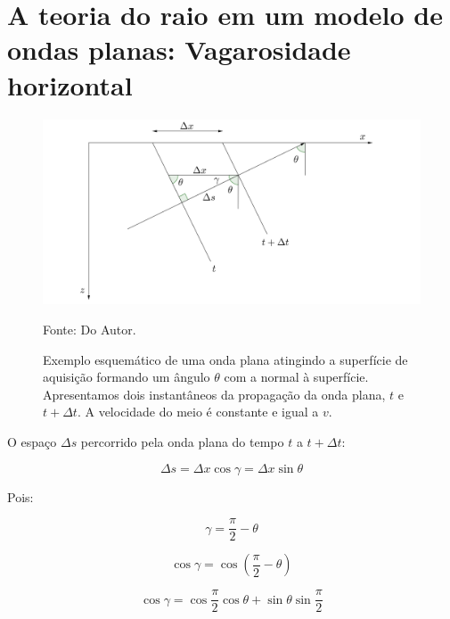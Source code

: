 \documentclass[a4paper, 12pt]{article}
\begin{document}
\section{A teoria do raio em um modelo de ondas planas: Vagarosidade horizontal}

\begin{figure}[H]
\caption{Exemplo esquemático de uma onda plana atingindo a superfície de aquisição formando um ângulo $\theta$
com a normal à superfície. Apresentamos dois instantâneos da propagação da onda plana, $t$ e $t + \Delta t$.
A velocidade do meio é constante e igual a $v$.}
\begin{center}
\includegraphics[scale=0.7]{images/raio_ondas_planas.png}
\vspace{-0.3cm}
\end{center}
\begin{center}
 Fonte: Do Autor.
\end{center}
\label{fig:1.1}
\end{figure}

O espaço $\Delta s$ percorrido pela onda plana do tempo $t$ a $t + \Delta t$:

\begin{equation}
\label{eq:1.1}
\Delta s = \Delta x \cos \gamma = \Delta x \sin \theta
\end{equation}

Pois:

\begin{equation}
\label{eq:1.2}
\gamma = \frac{\pi}{2} - \theta
\end{equation}

\begin{equation}
\label{eq:1.3}
\cos \gamma = \cos \left( \frac{\pi}{2} - \theta \right)
\end{equation}

\begin{equation}
\label{eq:1.4}
\cos \gamma = \cos \frac{\pi}{2} \cos \theta + \sin \theta \sin \frac{\pi}{2}
\end{equation}
\end{document}
